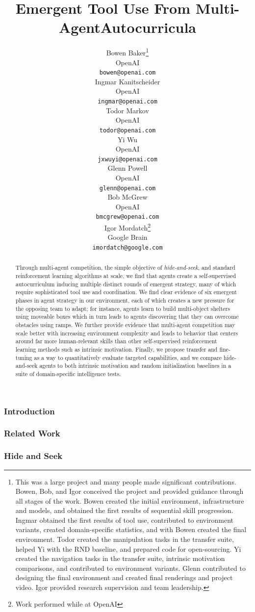 \documentclass{article} %
\title{Emergent Tool Use From Multi-Agent\newline Autocurricula}
\author{
\fontsize{8}{10}\hspace{-3px}Bowen Baker\thanks{This was a large project and many people made significant contributions. Bowen, Bob, and Igor conceived the project and provided guidance through all stages of the work. Bowen created the initial environment, infrastructure and models, and obtained the first results of sequential skill progression. Ingmar obtained the first results of tool use, contributed to environment variants, created domain-specific statistics, and with Bowen created the final environment. Todor created the manipulation tasks in the transfer suite, helped Yi with the RND baseline, and prepared code for open-sourcing. Yi created the navigation tasks in the transfer suite, intrinsic motivation comparisons, and contributed to environment variants. Glenn contributed to designing the final environment and created final renderings and project video. Igor provided research supervision and team leadership.} \\
\fontsize{8}{10}OpenAI\\
\fontsize{8}{10}\texttt{bowen@openai.com} \\
\fontsize{8}{10}\And
\fontsize{8}{10}Ingmar Kanitscheider\setcounter{footnote}{0}\footnotemark \\
\fontsize{8}{10}OpenAI\\
\fontsize{8}{10}\texttt{ingmar@openai.com} \\
\fontsize{8}{10}\And
\fontsize{8}{10}Todor Markov\setcounter{footnote}{0}\footnotemark \\
\fontsize{8}{10}OpenAI\\
\fontsize{8}{10}\texttt{todor@openai.com} \\
\fontsize{8}{10}\And
\fontsize{8}{10}Yi Wu\setcounter{footnote}{0}\footnotemark \\
\fontsize{8}{10}OpenAI\\
\fontsize{8}{10}\texttt{jxwuyi@openai.com} \\
\fontsize{8}{10}\And
\fontsize{8}{10}Glenn Powell\setcounter{footnote}{0}\footnotemark \\
\fontsize{8}{10}OpenAI\\
\fontsize{8}{10}\texttt{glenn@openai.com} \\
\fontsize{8}{10}\And
\fontsize{8}{10}Bob McGrew\setcounter{footnote}{0}\footnotemark \\
\fontsize{8}{10}OpenAI\\
\fontsize{8}{10}\texttt{bmcgrew@openai.com} \\
\fontsize{8}{10}\And
\fontsize{8}{10}Igor Mordatch\setcounter{footnote}{0}\footnotemark\hspace{4px}\thanks{Work performed while at OpenAI} \\
\fontsize{8}{10}Google Brain\\
\fontsize{8}{10}\texttt{imordatch@google.com} \\
}
\begin{document}
\doparttoc %
\faketableofcontents %

\part{} %

\maketitle

\begin{abstract}
Through multi-agent competition, the simple objective of \textit{hide-and-seek}, and standard reinforcement learning algorithms at scale, we find that agents create a self-supervised autocurriculum inducing multiple distinct rounds of emergent strategy, many of which require sophisticated tool use and coordination.
We find clear evidence of six emergent phases in agent strategy in our environment, each of which creates a new pressure for the opposing team to adapt; for instance, agents learn to build multi-object shelters using moveable boxes which in turn leads to agents discovering that they can overcome obstacles using ramps.
We further provide evidence that multi-agent competition may scale better with increasing environment complexity and leads to behavior that centers around far more human-relevant skills than other self-supervised reinforcement learning methods such as intrinsic motivation.
Finally, we propose transfer and fine-tuning as a way to quantitatively evaluate targeted capabilities, and we compare hide-and-seek agents to both intrinsic motivation and random initialization baselines in a suite of domain-specific intelligence tests.

\end{abstract}

\section{Introduction}


\section{Related Work}


\section{Hide and Seek}

\end{document}
